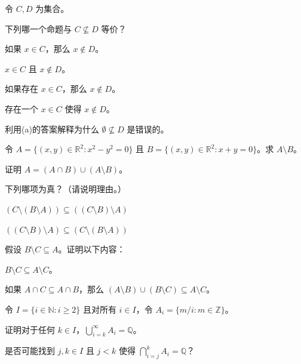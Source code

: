 \begin{problemset}
    \item 令 $C, D$ 为集合。
    \begin{probenumerate}
        \item 下列哪一个命题与 $C \not\subseteq D$ 等价？
        \begin{probenumerate}
            \item 如果 $x \in C$，那么 $x \notin D$。
            \item $x \in C$ 且 $x \notin D$。
            \item 如果存在 $x \in C$，那么 $x \notin D$。
            \item 存在一个 $x \in C$ 使得 $x \notin D$。
        \end{probenumerate}
        \item 利用(a)的答案解释为什么 $\emptyset \not\subseteq D$ 是错误的。
    \end{probenumerate}

    \item 令 $A = \{(x, y) \in \mathbb{R}^2 : x^2 - y^2 = 0\}$ 且 $B = \{(x, y) \in \mathbb{R}^2 : x + y = 0\}$。求 $A \setminus B$。

    \item 证明 $A = (A \cap B) \cup (A \setminus B)$。

    \item 下列哪项为真？（请说明理由。）
    \begin{probenumerate}
        \item $(C \setminus (B \setminus A)) \subseteq ((C \setminus B) \setminus A)$
        \item $((C \setminus B) \setminus A) \subseteq (C \setminus (B \setminus A))$
    \end{probenumerate}

    \item 假设 $B \setminus C \subseteq A$。证明以下内容：
    \begin{probenumerate}
        \item $B \setminus C \subseteq A \setminus C$。
        \item 如果 $A \cap C \subseteq A \cap B$，那么 $(A \setminus B) \cup (B \setminus C) \subseteq A \setminus C$。
    \end{probenumerate}

    \item 令 $I = \{i \in \mathbb{N} : i \geq 2\}$ 且对所有 $i \in I$，令 $A_i = \{m/i : m \in \mathbb{Z}\}$。
    \begin{probenumerate}
        \item 证明对于任何 $k \in I$，$\bigcup_{i=k}^{\infty} A_i = \mathbb{Q}$。
        \item 是否可能找到 $j, k \in I$ 且 $j < k$ 使得 $\bigcap_{i=j}^{k} A_i = \mathbb{Q}$？
    \end{probenumerate}


\end{problemset}

